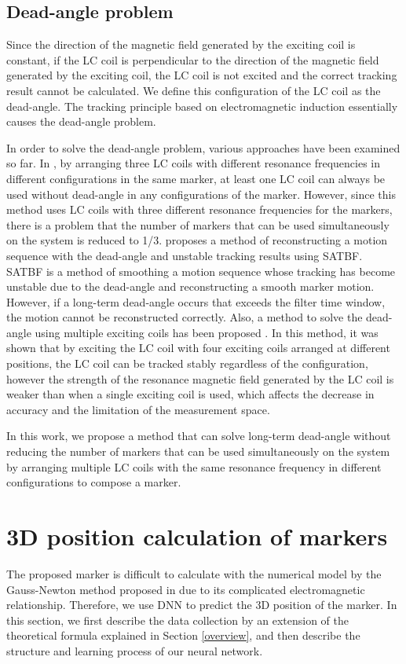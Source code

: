 \documentclass[journal,twoside,web]{ieeecolor}
\begin{document}
\subsection{Dead-angle problem}
Since the direction of the magnetic field generated by the exciting coil is constant, if the LC coil is perpendicular to the direction of the magnetic field generated by the exciting coil, the LC coil is not excited and the correct tracking result cannot be calculated. We define this configuration of the LC coil as the dead-angle. The tracking principle based on electromagnetic induction essentially causes the dead-angle problem.

In order to solve the dead-angle problem, various approaches have been examined so far. In \cite{im6d}, by arranging three LC coils with different resonance frequencies in different configurations in the same marker, at least one LC coil can always be used without dead-angle in any configurations of the marker. However, since this method uses LC coils with three different resonance frequencies for the markers, there is a problem that the number of markers that can be used simultaneously on the system is reduced to 1/3. \cite{im3d+} proposes a method of reconstructing a motion sequence with the dead-angle and unstable tracking results using SATBF. SATBF is a method of smoothing a motion sequence whose tracking has become unstable due to the dead-angle and reconstructing a smooth marker motion. However, if a long-term dead-angle occurs that exceeds the filter time window, the motion cannot be reconstructed correctly.
Also, a method to solve the dead-angle using multiple exciting coils has been proposed \cite{four_ext_coil}. In this method, it was shown that by exciting the LC coil with four exciting coils arranged at different positions, the LC coil can be tracked stably regardless of the configuration, however the strength of the resonance magnetic field generated by the LC coil is weaker than when a single exciting coil is used, which affects the decrease in accuracy and the limitation of the measurement space.

In this work, we propose a method that can solve long-term dead-angle without reducing the number of markers that can be used simultaneously on the system by arranging multiple LC coils with the same resonance frequency in different configurations to compose a marker.

\section{3D position calculation of markers}
\label{dnn}
The proposed marker is difficult to calculate with the numerical model by the Gauss-Newton method proposed in \cite{im3d, im6d, yabukami1, hashi1} due to its complicated electromagnetic relationship. Therefore, we use DNN to predict the 3D position of the marker. In this section, we first describe the data collection by an extension of the theoretical formula explained in Section \ref{overview}, and then describe the structure and learning process of our neural network.
\end{document}
